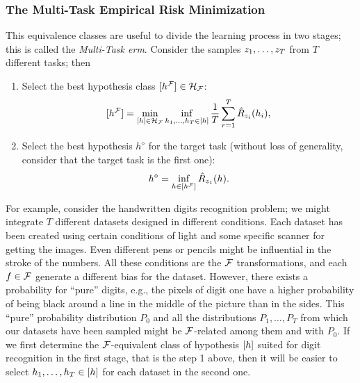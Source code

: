 \subsubsection*{The Multi-Task Empirical Risk Minimization}
This equivalence classes are useful to divide the learning process in two stages; this is called the \emph{Multi-Task \acrshort{erm}}. Consider the samples $z_1, \ldots, z_T$ from $T$ different tasks; then
\begin{enumerate}
    \item Select the best hypothesis class $\lbrack h^{\mathcal{F}}\rbrack \in \mathcal{H}_{\mathcal{F}}$:
    \begin{equation}
        \nonumber
        \lbrack h^{\mathcal{F}}\rbrack = \min_{\lbrack h\rbrack \in \mathcal{H}_{\mathcal{F}}} \inf_{h_1, \ldots, h_T \in \lbrack h\rbrack} \frac{1}{T} \sum_{r=1}^T \hat{R}_{z_i}(h_i) ,
    \end{equation}
    \item Select the best hypothesis $h^\diamond$ for the target task (without loss of generality, consider that the target task is the first one):
    \begin{equation}
        \nonumber
        h^\diamond = \inf_{h \in \lbrack h^{\mathcal{F}}\rbrack} \hat{R}_{z_1}(h) .
    \end{equation}
\end{enumerate}

For example, consider the handwritten digits recognition problem; we might integrate $T$ different datasets designed in different conditions. Each dataset has been created using certain conditions of light and some specific scanner for getting the images. Even different pens or pencils might be influential in the stroke of the numbers. All these conditions are the $\mathcal{F}$ transformations, and each $f \in \mathcal{F}$ generate a different bias for the dataset. However, there exists a probability for ``pure'' digits, e.g., the pixels of digit one have a higher probability of being black around a line in the middle of the picture than in the sides. This ``pure'' probability distribution $P_0$ and all the distributions $P_1, \ldots, P_T$ from which our datasets have been sampled might be $\mathcal{F}$-related among them and with $P_0$. If we first determine the $\mathcal{F}$-equivalent class of hypothesis $\lbrack h\rbrack$ suited for digit recognition in the first stage, that is the step 1 above, then it will be easier to select $h_1, \ldots, h_T \in \lbrack h\rbrack$ for each dataset in the second one.

